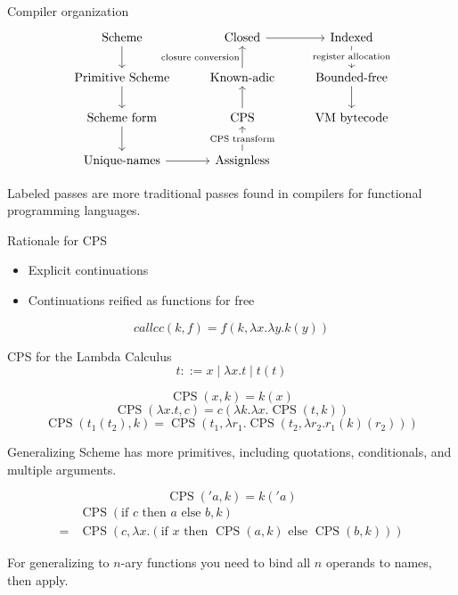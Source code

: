 \documentclass{beamer}
\begin{document}
\begin{frame}[fragile]{Compiler organization}
  \[\begin{tikzcd}
\text{Scheme} \arrow[d]           & \text{Closed} \arrow[r]      & \text{Indexed} \arrow[d, "\text{register allocation}" description]      \\
\text{Primitive Scheme} \arrow[d] & \text{Known-adic} \arrow[u, "\text{closure conversion}"]  & \text{Bounded-free} \arrow[d] \\
\text{Scheme form} \arrow[d]      & \text{CPS} \arrow[u]         & \text{VM bytecode}            \\
\text{Unique-names} \arrow[r]     & \text{Assignless} \arrow[u, "\text{CPS transform}" description] &                              
\end{tikzcd}\]

Labeled passes are more traditional passes found in compilers for functional programming languages.
\end{frame}

\begin{frame}{Rationale for CPS}
  \begin{itemize}
  \item Explicit continuations
  \item Continuations reified as functions for free
  \end{itemize}
  
  \[callcc(k, f)=f(k, \lambda x.\lambda y.k(y))\]
\end{frame}

\newcommand{\CPS}{\operatorname{CPS}}

\begin{frame}{CPS for the Lambda Calculus}
  \[t ::= x \mid \lambda x.t \mid t(t)\]
  
  \[\CPS(x, k)=k(x)\]
  \[\CPS(\lambda x.t, c)=c(\lambda k.\lambda x. \CPS(t, k))\]
  \[\CPS(t_1(t_2), k)=\CPS(t_1,\lambda r_1.\CPS(t_2,\lambda r_2.r_1(k)(r_2)))\]
\end{frame}

\begin{frame}{Generalizing}
  Scheme has more primitives, including quotations, conditionals, and multiple arguments.

  \[\CPS('a,k)=k('a)\]
  \[\begin{aligned}
    &\CPS(\text{if }c\text{ then }a\text{ else }b, k)\\
    =&\CPS(c, \lambda x.(\text{if }x\text{ then }\CPS(a,k)\text{ else }\CPS(b,k)))
  \end{aligned}\]

For generalizing to $n$-ary functions you need to bind all $n$ operands to names, then apply.
\end{frame}
\end{document}
